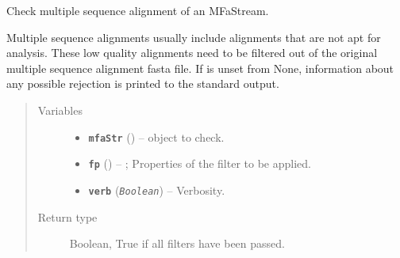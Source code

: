 \documentclass[letterpaper,10pt,english]{sphinxmanual}
\begin{document}
\begin{fulllineitems}
\label{fasta:libPoMo.fasta.filter_mfa_str}
Check multiple sequence alignment of an MFaStream.

Multiple sequence alignments usually include alignments that are
not apt for analysis.  These low quality alignments need to be
filtered out of the original multiple sequence alignment fasta
file.  If  is unset from None, information about any
possible rejection is printed to the standard output.
\begin{quote}\begin{description}
\item[{Variables}] \leavevmode\begin{itemize}
\item {} 
\textbf{\texttt{mfaStr}} ({\hyperref[fasta:libPoMo.fasta.MFaStream]{}}) -- {\hyperref[fasta:libPoMo.fasta.MFaStream]{}} object to check.

\item {} 
\textbf{\texttt{fp}} ({\hyperref[fasta:libPoMo.fasta.MFaStrFilterProps]{}}) -- {\hyperref[fasta:libPoMo.fasta.MFaStrFilterProps]{}}; Properties
of the filter to be applied.

\item {} 
\textbf{\texttt{verb}} (\emph{\texttt{Boolean}}) -- Verbosity.

\end{itemize}

\item[{Return type}] \leavevmode
Boolean, True if all filters have been passed.

\end{description}\end{quote}

\end{fulllineitems}

\end{document}
